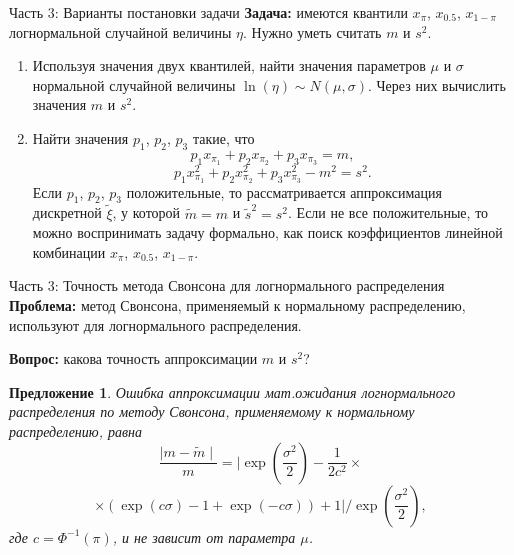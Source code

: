 \documentclass[ucs, notheorems, handout]{beamer}
\newtheorem{proposition2}[theorem]{Предложение}
\begin{document}
\begin{frame}{Часть 3: Варианты постановки задачи}
	\textbf{Задача:} имеются квантили $x_{\pi}$, $x_{0.5}$, $x_{1-\pi}$ логнормальной случайной величины $\eta$. Нужно уметь считать $m$ и $s^{2}$.
	
	\begin{enumerate}
		\item Используя значения двух квантилей, найти значения параметров $\mu$ и $\sigma$ нормальной случайной величины $\ln(\eta)\sim N(\mu, \sigma)$. Через них вычислить значения $m$ и $s^{2}$.
		\item Найти значения $p_{1}$, $p_{2}$, $p_{3}$ такие, что 
		\begin{equation*}
			p_{1}x_{\pi_{1}} + p_{2}x_{\pi_{2}} + p_{3}x_{\pi_{3}} = m, \label{2}
		\end{equation*}
		\begin{equation*}
			p_{1} x_{\pi_{1}}^{2} + p_{2} x_{\pi_{2}}^{2} + p_{3} x_{\pi_{3}}^{2} - m^{2} = s^{2}.
		\end{equation*}
		Если $p_{1}$, $p_{2}$, $p_{3}$ положительные, то рассматривается аппроксимация дискретной $\tilde{\xi}$, у которой $\tilde{m} = m$ и $\tilde{s}^{2}=s^{2}$.
		Если не все положительные, то можно воспринимать задачу формально, как поиск коэффициентов линейной комбинации $x_{\pi}$, $x_{0.5}$, $x_{1-\pi}$. 
	\end{enumerate}
\end{frame}

\begin{frame}{Часть 3: Точность метода Свонсона для логнормального распределения}
	\textbf{Проблема:} метод Свонсона, применяемый к нормальному распределению, используют для логнормального распределения.
	
	\textbf{Вопрос:} какова точность аппроксимации $m$ и $s^{2}$?
	
	\begin{proposition2}\label{pr5}
		Ошибка аппроксимации мат.ожидания логнормального распределения по методу Свонсона, применяемому к нормальному распределению, равна
		\[\dfrac{\mid m - \widetilde{m} \mid}{m} = \biggl| \exp\left( \dfrac{\sigma^{2}}{2}\right)  - \dfrac{1}{2 c^{2}}\times\]\[\times(\exp(c\sigma)-1 +\exp(-c\sigma)) + 1 \biggr|/\exp\left(\dfrac{\sigma^{2}}{2}\right),\]
		где $c = \Phi^{-1}(\pi)$, и не зависит от параметра $\mu$.
	\end{proposition2}
\end{frame}
\end{document}
